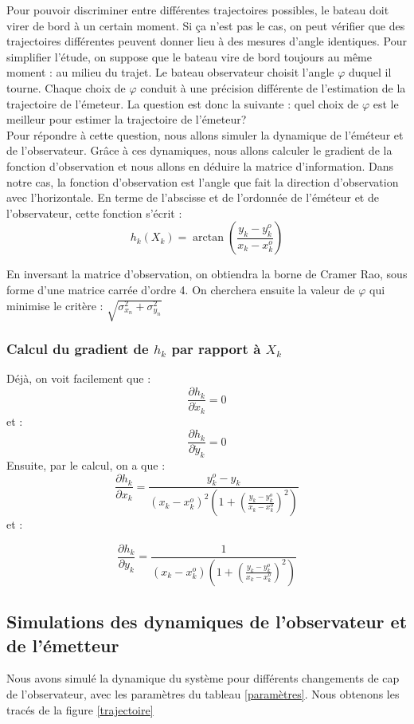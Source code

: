 \documentclass{article}
\begin{document}
Pour pouvoir discriminer entre différentes
trajectoires possibles, le bateau doit virer de bord à un certain moment. Si ça n'est pas le cas, on peut vérifier que des trajectoires différentes peuvent donner lieu à des mesures d'angle identiques.
Pour simplifier l'étude, on suppose que le bateau vire de bord toujours au même moment : au milieu du trajet. Le bateau observateur choisit l'angle $\varphi $ duquel il tourne. Chaque choix de $\varphi$ 
conduit à une précision différente de l'estimation de la trajectoire  de l'émeteur.
La question est donc la suivante : quel choix de $\varphi$ est le meilleur pour estimer la trajectoire de l'émeteur?
\\
Pour répondre à cette question, nous allons simuler la dynamique de l'éméteur et de l'observateur. Grâce à ces dynamiques, nous allons
calculer le gradient de la fonction d'observation et nous allons en déduire la matrice d'information.
Dans notre cas, la fonction d'observation est l'angle que fait la direction d'observation avec l'horizontale. 
En terme de l'abscisse et de l'ordonnée de l'éméteur et de l'observateur, cette fonction s'écrit : 
\[h_{k}(X_{k})=\arctan \left(\frac{y_{k}-y_{k}^{o}}{x_{k}-x_{k}^{o}}\right)\]

En inversant la matrice d'observation, on obtiendra la borne de Cramer Rao, sous forme d'une matrice carrée d'ordre 4.
On cherchera ensuite la valeur de $\varphi$ qui minimise le critère : $\sqrt{\sigma_{x_{n}}^{2}+\sigma_{y_{n}}^{2}}$

\subsubsection{Calcul du gradient de $h_{k}$ par rapport à $X_{k}$}
Déjà, on voit facilement que : 
\[\frac{\partial h_{k}}{\partial \dot{x}_{k}} = 0 \] et :
\[\frac{\partial h_{k}}{\partial \dot{y}_{k}} = 0 \]
Ensuite, par le calcul, on a que : 
\[\frac{\partial h_{k}}{\partial x_{k}}=\frac{y_{k}^{o}-y_{k}}{\left(x_{k}-x_{k}^{o}\right)^{2}\left(1+\left(\frac{y_{k}-y_{k}^{o}}{x_{k}-x_{k}^{o}}\right)^{2}\right)}\]
et :

\[\frac{\partial h_{k}}{\partial y_{k}}= \frac{1}{\left(x_{k}-x_{k}^{o}\right)\left(1+\left( \frac{y_{k}-y_{k}^{o}}{x_{k}-x_{k}^{o}}  \right)^{2}\right)}\]
\subsection{Simulations des dynamiques de l'observateur et de l'émetteur}
Nous avons simulé la dynamique du système pour différents changements de cap de l'observateur, avec les paramètres du tableau \ref{paramètres}.
 Nous obtenons les tracés de la figure \ref{trajectoire}
\end{document}
